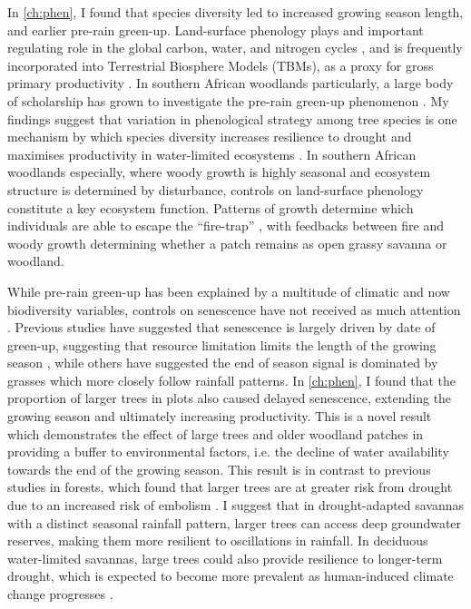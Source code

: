 \begin{refsection}
In \autoref{ch:phen}, I found that species diversity led to increased growing season length, and earlier pre-rain green-up. Land-surface phenology plays and important regulating role in the global carbon, water, and nitrogen cycles \citep{Richardson2013}, and is frequently incorporated into Terrestrial Biosphere Models (TBMs), as a proxy for gross primary productivity \citep{Bloom2016}. In southern African woodlands particularly, a large body of scholarship has grown to investigate the pre-rain green-up phenomenon \citep{Ryan2017, Adole2018}. My findings suggest that variation in phenological strategy among tree species is one mechanism by which species diversity increases resilience to drought and maximises productivity in water-limited ecosystems \citep{Stan2019, Morellato2016}. In southern African woodlands especially, where woody growth is highly seasonal and ecosystem structure is determined by disturbance, controls on land-surface phenology constitute a key ecosystem function. Patterns of growth determine which individuals are able to escape the ``fire-trap'' \citep{Dantas2013}, with feedbacks between fire and woody growth determining whether a patch remains as open grassy savanna or woodland.

While pre-rain green-up has been explained by a multitude of climatic and now biodiversity variables, controls on senescence have not received as much attention \citep{Gallinat2015}. Previous studies have suggested that senescence is largely driven by date of green-up, suggesting that resource limitation limits the length of the growing season \citep{Zani2020}, while others have suggested the end of season signal is dominated by grasses which more closely follow rainfall patterns. In \autoref{ch:phen}, I found that the proportion of larger trees in plots also caused delayed senescence, extending the growing season and ultimately increasing productivity. This is a novel result which demonstrates the effect of large trees and older woodland patches in providing a buffer to environmental factors, i.e. the decline of water availability towards the end of the growing season. This result is in contrast to previous studies in forests, which found that larger trees are at greater risk from drought due to an increased risk of embolism \citep{Bennett2015}. I suggest that in drought-adapted savannas with a distinct seasonal rainfall pattern, larger trees can access deep groundwater reserves, making them more resilient to oscillations in rainfall. In deciduous water-limited savannas, large trees could also provide resilience to longer-term drought, which is expected to become more prevalent as human-induced climate change progresses \citep{Kusangaya2014}. 


\end{refsection}
